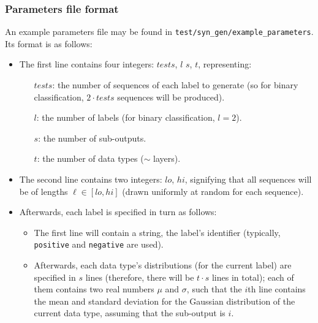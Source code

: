 \documentclass[12pt]{article}
\begin{document}
	\subsubsection{Parameters file format}
	An example parameters file may be found in {\tt test/syn\_gen/example\_parameters}. Its format is as follows:
	\begin{itemize}
		\item The first line contains four integers: $tests$, $l$ $s$, $t$, representing:
		\begin{itemize}
			\item[$tests$:] the number of sequences of each label to generate (so for binary classification, $2\cdot tests$ sequences will be produced).
			\item[$l$:] the number of labels (for binary classification, $l = 2$).
			\item[$s$:] the number of sub-outputs.
			\item[$t$:] the number of data types ($\sim$ layers).
		\end{itemize}
		\item The second line contains two integers: $lo$, $hi$, signifying that all sequences will be of lengths $\ell \in [lo, hi]$ (drawn uniformly at random for each sequence).
		\item Afterwards, each label is specified in turn as follows:
		\begin{itemize}
			\item The first line will contain a string, the label's identifier (typically, {\tt positive} and {\tt negative} are used).
			\item Afterwards, each data type's distributions (for the current label) are specified in $s$ lines (therefore, there will be $t \cdot s$ lines in total); each of them contains two real numbers $\mu$ and $\sigma$, such that the $i$th line contains the mean and standard deviation for the Gaussian distribution of the current data type, assuming that the sub-output is $i$.
		\end{itemize}
	\end{itemize}
\end{document}
